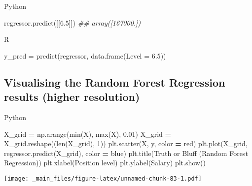 \documentclass[
]{book}
\newenvironment{Shaded}{\begin{snugshade}}{\end{snugshade}}
\newcommand{\AttributeTok}[1]{\textcolor[rgb]{0.77,0.63,0.00}{#1}}
\newcommand{\BuiltInTok}[1]{#1}
\newcommand{\CommentTok}[1]{\textcolor[rgb]{0.56,0.35,0.01}{\textit{#1}}}
\newcommand{\DecValTok}[1]{\textcolor[rgb]{0.00,0.00,0.81}{#1}}
\newcommand{\FloatTok}[1]{\textcolor[rgb]{0.00,0.00,0.81}{#1}}
\newcommand{\FunctionTok}[1]{\textcolor[rgb]{0.00,0.00,0.00}{#1}}
\newcommand{\NormalTok}[1]{#1}
\newcommand{\OperatorTok}[1]{\textcolor[rgb]{0.81,0.36,0.00}{\textbf{#1}}}
\newcommand{\OtherTok}[1]{\textcolor[rgb]{0.56,0.35,0.01}{#1}}
\newcommand{\StringTok}[1]{\textcolor[rgb]{0.31,0.60,0.02}{#1}}
\theoremstyle{definition}
\theoremstyle{definition}
\theoremstyle{definition}
\theoremstyle{definition}
\theoremstyle{remark}
\begin{document}
Python

\begin{Shaded}
\begin{Highlighting}[]
\NormalTok{regressor.predict([[}\FloatTok{6.5}\NormalTok{]])}
\CommentTok{\#\# array([167000.])}
\end{Highlighting}
\end{Shaded}

R

\begin{Shaded}
\begin{Highlighting}[]
\NormalTok{y\_pred }\OtherTok{=} \FunctionTok{predict}\NormalTok{(regressor, }\FunctionTok{data.frame}\NormalTok{(}\AttributeTok{Level =} \FloatTok{6.5}\NormalTok{))}
\end{Highlighting}
\end{Shaded}

\hypertarget{visualising-the-random-forest-regression-results-higher-resolution}{%
\subsection{Visualising the Random Forest Regression results (higher resolution)}\label{visualising-the-random-forest-regression-results-higher-resolution}}

Python

\begin{Shaded}
\begin{Highlighting}[]
\NormalTok{X\_grid }\OperatorTok{=}\NormalTok{ np.arange(}\BuiltInTok{min}\NormalTok{(X), }\BuiltInTok{max}\NormalTok{(X), }\FloatTok{0.01}\NormalTok{)}
\NormalTok{X\_grid }\OperatorTok{=}\NormalTok{ X\_grid.reshape((}\BuiltInTok{len}\NormalTok{(X\_grid), }\DecValTok{1}\NormalTok{))}
\NormalTok{plt.scatter(X, y, color }\OperatorTok{=} \StringTok{\textquotesingle{}red\textquotesingle{}}\NormalTok{)}
\NormalTok{plt.plot(X\_grid, regressor.predict(X\_grid), color }\OperatorTok{=} \StringTok{\textquotesingle{}blue\textquotesingle{}}\NormalTok{)}
\NormalTok{plt.title(}\StringTok{\textquotesingle{}Truth or Bluff (Random Forest Regression)\textquotesingle{}}\NormalTok{)}
\NormalTok{plt.xlabel(}\StringTok{\textquotesingle{}Position level\textquotesingle{}}\NormalTok{)}
\NormalTok{plt.ylabel(}\StringTok{\textquotesingle{}Salary\textquotesingle{}}\NormalTok{)}
\NormalTok{plt.show()}
\end{Highlighting}
\end{Shaded}

\texttt{[image: \_main\_files/figure-latex/unnamed-chunk-83-1.pdf]}
\end{document}
